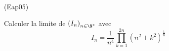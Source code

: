 \begin{tiny}(Eap05)\end{tiny}
Calculer la limite de $ \left(I_n\right)_{n\in\N^*}$ avec 
\begin{displaymath}
 I_n = \frac{1}{n^4}\prod_{k=1}^{2n}(n^2+k^2)^{\frac{1}{n}}
\end{displaymath}
